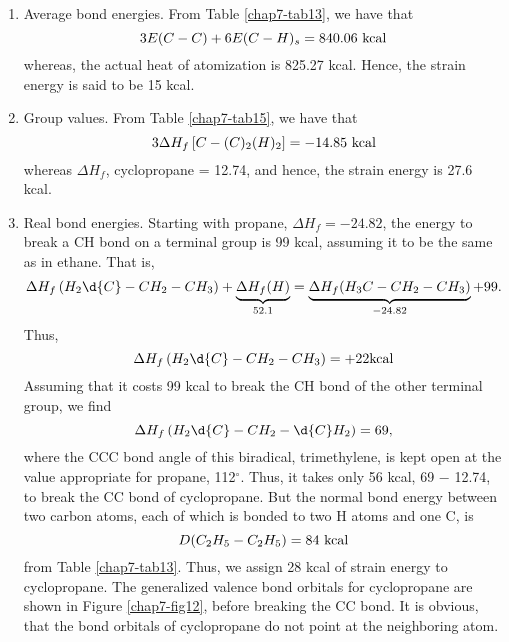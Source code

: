 \begin{enumerate}
\item Average bond energies.  From Table \ref{chap7-tab13}, we have that
\begin{equation}
3E(C-C) + 6E(C-H)_s = 840.06 ~ {\rm kcal}
\end{equation}
whereas, the actual heat of atomization is 825.27 kcal.  Hence, the strain 
energy is said to be 15 kcal.

\item Group values.  From Table \ref{chap7-tab15}, we have that
\begin{equation}
3 \Delta H_f \left[ C-(C)_2 (H)_2 \right] = - 14.85 ~ {\rm kcal}
\end{equation}
whereas $\Delta H_f$, cyclopropane = 12.74, and hence, the strain 
energy is 27.6 kcal.

\item Real bond energies.  Starting with propane, $\Delta H_f = 
-24.82$, the energy to break a CH bond on a terminal group is 99 
kcal, assuming it to be the same as in ethane. That is,
\begin{equation}
\Delta H_f \left( H_2 {\d{C}} - CH_2 - CH_3 \right) + \underbrace{\Delta 
H_f (H)}_{52.1} = \underbrace{\Delta H_f (H_3C - CH_2 - 
CH_3)}_{-24.82} + 99.
\end{equation}
Thus,
\begin{equation}
\Delta H_f \left( H_2 {\d{C}} - CH_2 - CH_3 \right) = + 22 {\rm kcal}
\end{equation}
Assuming that it costs 99 kcal to break the CH bond of the other 
terminal group, we find
\begin{equation}
\Delta H_f \left( H_2 {\d{C}} - CH_2 - {\d{C}}H_2 \right) = 69,
\end{equation}
where the CCC bond angle of this biradical, trimethylene, is kept 
open at the value appropriate for propane, 112$^{\circ}$.  Thus, it takes 
only 56 kcal, 69 $-$ 12.74, to break the CC bond of cyclopropane.  But 
the normal bond energy between two carbon atoms, each of which is 
bonded to two H atoms and one C, is
\begin{equation}
D(C_2H_5 - C_2H_5) = 84 ~{\rm kcal}
\end{equation}
from Table \ref{chap7-tab13}.  Thus, we assign 28 kcal of strain
energy to cyclopropane.  The generalized valence bond orbitals for
cyclopropane are shown in Figure \ref{chap7-fig12}, before breaking
the CC bond.  It is obvious, that the bond orbitals of cyclopropane do
not point at the neighboring atom.
\end{enumerate}

